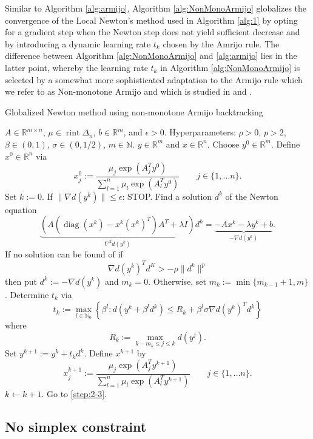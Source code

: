 \documentclass[10pt,a4paper]{article}
\numberwithin{equation}{section}
\theoremstyle{definition}
\def\rr{{\mathbb R}}
\def\nn{{\mathbb N}}
\DeclareMathOperator{\diag}{diag}
\DeclareMathOperator{\rint}{rint}
\begin{document}
Similar to Algorithm \eqref{alg:armijo},  Algorithm \eqref{alg:NonMonoArmijo} globalizes the convergence of the Local Newton's method used in Algorithm \eqref{alg:1} by opting for a gradient step when the Newton step does not yield sufficient decrease and by introducing a dynamic learning rate $t_k$ chosen by the Amrijo rule. The difference between  Algorithm \eqref{alg:NonMonoArmijo} and \eqref{alg:armijo} lies in the latter point, whereby the learning rate $t_k$ in Algorithm \eqref{alg:NonMonoArmijo} is selected by a somewhat more sophisticated adaptation to the Armijo rule which we refer to as Non-monotone Armijo and which is studied in \cite{Grippo1986Nonmonotone} and \cite{Grippo1989}.


\begin{algorithm}[h!]
\caption{Globalized Newton method using non-monotone Armijo backtracking}\label{alg:NonMonoArmijo}
\begin{algorithmic}[1]
\Require $A \in \rr^{m \times n}$, $\mu \in \rint \Delta_n$, $b \in \rr^m$, and $\epsilon > 0$. Hyperparameters: $\rho>0$, $p > 2$, $\beta \in (0,1)$, $\sigma \in (0, 1/2)$, $m \in \nn$.
\Ensure $y \in \rr^m$ and $x \in \rr^n$.
\State Choose $y^0 \in \rr^m$. Define $x^0 \in \rr^n$ via \[
x_j^0 := \frac{\mu_j \exp(A_j^Ty^0)}{\sum_{l=1}^n \mu_l \exp(A_l^Ty^0)} \qquad j \in \{1, \dots n\}.
\]
Set $k:= 0$.
\State If $\lVert \nabla d(y^k) \rVert \leq \epsilon$: STOP. \label{step:2-3}
\State Find a solution $d^k$ of the Newton equation \[
\underbrace{(A(\diag(x^k) - x^k (x^k)^T)A^T + \lambda I)}_{\nabla^2 d(y^k)}d^k = \underbrace{-Ax^k - \lambda y^k + b}_{- \nabla d(y^k)}.
\]
If no solution can be found of if \[
\nabla d(y^k)^Td^K > -\rho \lVert d^k \rVert^p
\]
then put $d^k := - \nabla d(y^k)$ and $m_k=0$. Otherwise, set $m_k:= \min \{m_{k-1}+1, m\}$.
\State Determine $t_k$ via 
\[
t_k := \max_{l \in \nn_0} \left\{ \beta^l : d(y^k + \beta^ld^k) \leq R_k + \beta^l\sigma \nabla d(y^k)^T d^k \right\}
\]
where \[
R_k := \max_{k - m_k \leq j \leq k} d(y^j).
\]
\State Set $y^{k+1} := y^k + t_k d^k$. Define $x^{k+1}$ by 
\[
x_j^{k+1}:=\frac{\mu_j \exp(A_j^Ty^{k+1})}{\sum_{l=1}^n \mu_l \exp(A_l^Ty^{k+1})} \qquad j \in \{1, \dots n\}.
\]
\State $k \gets k+1$. Go to \eqref{step:2-3}.
\end{algorithmic}
\end{algorithm}

\subsection{No simplex constraint}
\end{document}

